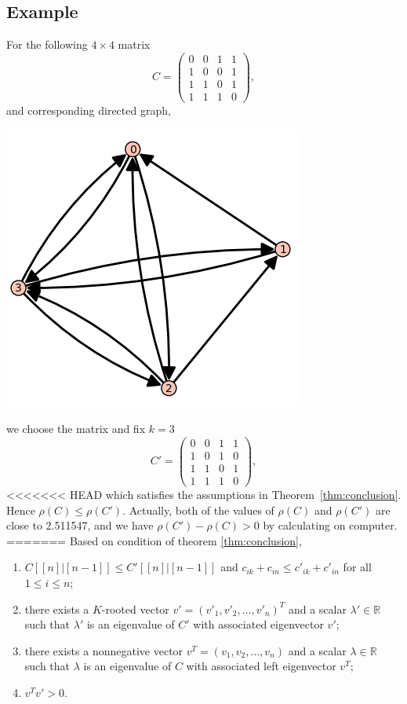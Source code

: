 \documentclass[12pt, a4paper]{article}
\theoremstyle{plain}
\theoremstyle{definition}
\begin{document}
\subsection{Example}
    For the following $4\times 4$ matrix
    $$C=\begin{pmatrix}
    0 & 0 & 1 & 1\\
    1 & 0 & 0 & 1\\
    1 & 1 & 0 & 1\\
    1 & 1 & 1 & 0
    \end{pmatrix},$$
    and corresponding directed graph, \cite[sage]{sage}
    \begin{center}
    \includegraphics{graph_C.PNG}
    \end{center}
    we choose the matrix and fix $k = 3$
    $$C'=\begin{pmatrix}
    0 & 0 & 1 & 1\\
    1 & 0 & 1 & 0\\
    1 & 1 & 0 & 1\\
    1 & 1 & 1 & 0
    \end{pmatrix},$$
<<<<<<< HEAD
    which satisfies the assumptions in Theorem~\ref{thm:conclusion}. Hence $\rho(C)\leq\rho(C')$.
     Actually, both of the values of $\rho(C)$ and $\rho(C')$ are close to 2.511547, and we have
      $\rho(C')-\rho(C)>0$ by calculating on computer.
=======
    Based on condition of theorem \ref{thm:conclusion},
    \begin{enumerate}[label=(\roman*)]
        \item  $C[[n]|[n-1]]\leq C'[[n]|[n-1]]$ and $c_{ik}+c_{in}\leq c'_{ik}+c'_{in}$ for all $1\leq i\leq n$;
        \item  there exists a $K$-rooted vector $v'=(v'_1, v'_2, \ldots, v'_n)^T$ and a scalar $\lambda'\in \mathbb{R}$
        such that $\lambda'$ is an eigenvalue of $C'$ with associated eigenvector $v'$;
        \item there exists a nonnegative vector $v^T=(v_1, v_2, \ldots, v_n)$ and a scalar $\lambda\in \mathbb{R}$ 
        such that $\lambda$ is an eigenvalue of $C$ with associated left eigenvector $v^T$;
        \item $v^Tv'>0.$
    \end{enumerate}
\end{document}
